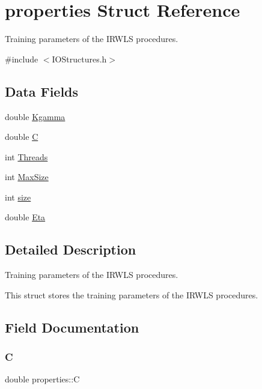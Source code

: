 \hypertarget{structproperties}{}\section{properties Struct Reference}
\label{structproperties}


Training parameters of the I\+R\+W\+LS procedures.  




{\ttfamily \#include $<$I\+O\+Structures.\+h$>$}

\subsection*{Data Fields}
\begin{DoxyCompactItemize}
\item 
double \hyperlink{structproperties_aab9c0195a446f08fc782701750ddb6ac}{Kgamma}
\item 
double \hyperlink{structproperties_a3b98814395b295db30f029e5e67ae9c9}{C}
\item 
int \hyperlink{structproperties_a56ab77c44fb808e71990074bd75529ed}{Threads}
\item 
int \hyperlink{structproperties_a42219768dd35e1ab628e1785759df400}{Max\+Size}
\item 
int \hyperlink{structproperties_a1694aebbbdd904f9b0e5faca725966b6}{size}
\item 
double \hyperlink{structproperties_abd91deb543a31a6a1f75892af7cf95c8}{Eta}
\end{DoxyCompactItemize}


\subsection{Detailed Description}
Training parameters of the I\+R\+W\+LS procedures. 

This struct stores the training parameters of the I\+R\+W\+LS procedures. 

\subsection{Field Documentation}
\hypertarget{structproperties_a3b98814395b295db30f029e5e67ae9c9}{}\label{structproperties_a3b98814395b295db30f029e5e67ae9c9} 
\subsubsection{\texorpdfstring{C}{C}}
{\ttfamily double properties\+::C}

